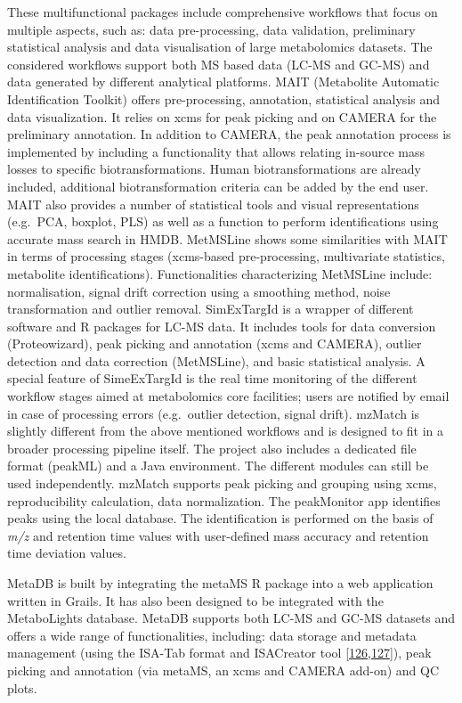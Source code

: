 \documentclass[]{article}
\begin{document}
These multifunctional packages include comprehensive workflows that focus on multiple aspects, such as: data pre-processing, data validation, preliminary statistical analysis and data visualisation of large metabolomics datasets. The considered workflows support both MS based data (LC-MS and GC-MS) and data generated by different analytical platforms. MAIT (Metabolite Automatic Identification Toolkit) offers pre-processing, annotation, statistical analysis and data visualization. It relies on xcms for peak picking and on CAMERA for the preliminary annotation. In addition to CAMERA, the peak annotation process is implemented by including a functionality that allows relating in-source mass losses to specific biotransformations. Human biotransformations are already included, additional biotransformation criteria can be added by the end user. MAIT also provides a number of statistical tools and visual representations (e.g.~PCA, boxplot, PLS) as well as a function to perform identifications using accurate mass search in HMDB. MetMSLine shows some similarities with MAIT in terms of processing stages (xcms-based pre-processing, multivariate statistics, metabolite identifications). Functionalities characterizing MetMSLine include: normalisation, signal drift correction using a smoothing method, noise transformation and outlier removal. SimExTargId is a wrapper of different software and R packages for LC-MS data. It includes tools for data conversion (Proteowizard), peak picking and annotation (xcms and CAMERA), outlier detection and data correction (MetMSLine), and basic statistical analysis. A special feature of SimeExTargId is the real time monitoring of the different workflow stages aimed at metabolomics core facilities; users are notified by email in case of processing errors (e.g.~outlier detection, signal drift). mzMatch is slightly different from the above mentioned workflows and is designed to fit in a broader processing pipeline itself. The project also includes a dedicated file format (peakML) and a Java environment. The different modules can still be used independently. mzMatch supports peak picking and grouping using xcms, reproducibility calculation, data normalization. The peakMonitor app identifies peaks using the local database. The identification is performed on the basis of \emph{m/z} and retention time values with user-defined mass accuracy and retention time deviation values.

MetaDB is built by integrating the metaMS R package into a web application written in Grails. It has also been designed to be integrated with the MetaboLights database. MetaDB supports both LC-MS and GC-MS datasets and offers a wide range of functionalities, including: data storage and metadata management (using the ISA-Tab format and ISACreator tool {[}\protect\hyperlink{ref-roccaserra_2010}{126},\protect\hyperlink{ref-sansone_2012}{127}{]}), peak picking and annotation (via metaMS, an xcms and CAMERA add-on) and QC plots.
\end{document}
